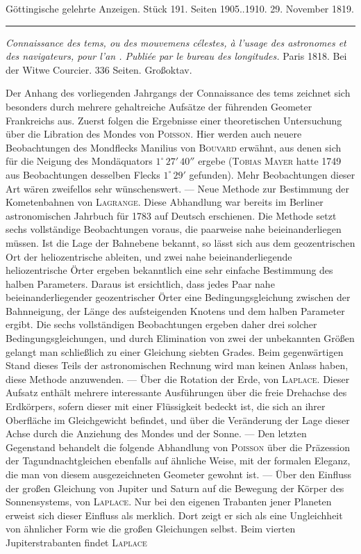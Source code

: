 \clearpage
{}
\begin{center}\small Göttingische gelehrte Anzeigen. Stück 191. Seiten 1905..1910. 29. November 1819.\\[3pt]\rule{.72\linewidth}{.3pt}\end{center}

\noindent\emph{Connaissance des tems, ou des mouvemens célestes, à l'usage des astronomes et des navigateurs, pour l'an {}. Publiée par le bureau des longitudes.} Paris 1818. Bei der Witwe Courcier. 336 Seiten. Großoktav.

\begingroup{}\relax
Der Anhang des vorliegenden Jahrgangs der Connaissance des tems zeichnet sich besonders durch mehrere gehaltreiche Aufsätze der führenden Geometer Frankreichs aus. Zuerst folgen die Ergebnisse einer theoretischen Untersuchung über die Libration des Mondes von \textsc{Poisson}. Hier werden auch neuere Beobachtungen des Mondflecks Manilius von \textsc{Bouvard} erwähnt, aus denen sich für die Neigung des Mondäquators $1^\circ\,27'\,40''$ ergebe (\textsc{Tobias Mayer} hatte 1749 aus Beobachtungen desselben Flecks $1^\circ\,29'$ gefunden). Mehr Beobachtungen dieser Art wären zweifellos sehr wünschenswert. --- Neue Methode zur Bestimmung der Kometenbahnen von \textsc{Lagrange}. Diese Abhandlung war bereits im Berliner astronomischen Jahrbuch für 1783 auf Deutsch erschienen. Die Methode setzt sechs vollständige Beobachtungen voraus, die paarweise nahe beieinanderliegen müssen. Ist die Lage der Bahnebene bekannt, so lässt sich aus dem geozentrischen Ort der heliozentrische ableiten, und zwei nahe beieinanderliegende heliozentrische Örter ergeben bekanntlich eine sehr einfache Bestimmung des halben Parameters. Daraus ist ersichtlich, dass jedes Paar nahe beieinanderliegender geozentrischer Örter eine Bedingungsgleichung zwischen der Bahnneigung, der Länge des aufsteigenden Knotens und dem halben Parameter ergibt. Die sechs vollständigen Beobachtungen ergeben daher drei solcher Bedingungsgleichungen, und durch Elimination von zwei der unbekannten Größen gelangt man schließlich zu einer Gleichung siebten Grades. Beim gegenwärtigen Stand dieses Teils der astronomischen Rechnung wird man keinen Anlass haben, diese Methode anzuwenden. --- Über die Rotation der Erde, von \textsc{Laplace}. Dieser Aufsatz enthält mehrere interessante Ausführungen über die freie Drehachse des Erdkörpers, sofern dieser mit einer Flüssigkeit bedeckt ist, die sich an ihrer Oberfläche im Gleichgewicht befindet, und über die Veränderung der Lage dieser Achse durch die Anziehung des Mondes und der Sonne. --- Den letzten Gegenstand behandelt die folgende Abhandlung von \textsc{Poisson} über die Präzession der Tagundnachtgleichen ebenfalls auf ähnliche Weise, mit der formalen Eleganz, die man von diesem ausgezeichneten Geometer gewohnt ist. --- Über den Einfluss der großen Gleichung von Jupiter und Saturn auf die Bewegung der Körper des Sonnensystems, von \textsc{Laplace}. Nur bei den eigenen Trabanten jener Planeten erweist sich dieser Einfluss als merklich. Dort zeigt er sich als eine Ungleichheit von ähnlicher Form wie die großen Gleichungen selbst. Beim vierten Jupiterstrabanten findet \textsc{Laplace} 